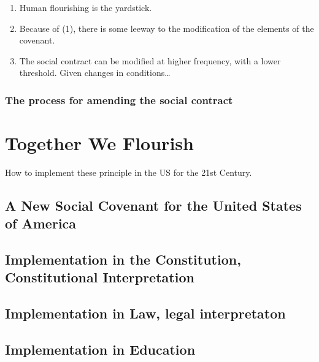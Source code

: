 \documentclass[
]{book}
\providecommand{\tightlist}{%
  \setlength{\itemsep}{0pt}\setlength{\parskip}{0pt}}
\begin{document}
\begin{enumerate}
\def\labelenumi{\arabic{enumi}.}
\tightlist
\item
  Human flourishing is the yardstick.
\item
  Because of (1), there is some leeway to the modification of the
  elements of the covenant.
\item
  The social contract can be modified at higher frequency, with a
  lower threshold. Given changes in conditions\ldots{}
\end{enumerate}

\hypertarget{the-process-for-amending-the-social-contract}{%
\section{The process for amending the social contract}\label{the-process-for-amending-the-social-contract}}

\hypertarget{part-together-we-flourish}{%
\part{Together We Flourish}\label{part-together-we-flourish}}

How to implement these principle in the US for the 21st Century.

\hypertarget{a-new-social-covenant-for-the-united-states-of-america}{%
\chapter{A New Social Covenant for the United States of America}\label{a-new-social-covenant-for-the-united-states-of-america}}

\hypertarget{implementation-in-the-constitution-constitutional-interpretation}{%
\chapter{Implementation in the Constitution, Constitutional Interpretation}\label{implementation-in-the-constitution-constitutional-interpretation}}

\hypertarget{implementation-in-law-legal-interpretaton}{%
\chapter{Implementation in Law, legal interpretaton}\label{implementation-in-law-legal-interpretaton}}

\hypertarget{implementation-in-education}{%
\chapter{Implementation in Education}\label{implementation-in-education}}
\end{document}
